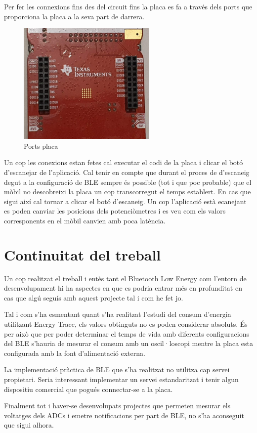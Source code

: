 Per fer les connexions fins des del circuit fins la placa es fa a través dels ports que proporciona la placa a la seva part de darrera.

\begin{figure}[!h]
	\begin{center}
		\includegraphics[angle=90, width=0.6\textwidth]{./images/connexions_placa.jpg}
		\caption{Ports placa}
	\end{center}
\end{figure}

Un cop les conexions estan fetes cal executar el codi de la placa i clicar el botó d'escanejar de l'aplicació.
Cal tenir en compte que durant el proces de d'escaneig degut a la configuració de BLE sempre és possible (tot i que poc probable) que el mòbil no descobreixi la placa un cop transcorregut el temps establert.
En cas que sigui així cal tornar a clicar el botó d'escaneig.
Un cop l'aplicació està ecanejant es poden canviar les posicions dels potenciòmetres i es veu com els valors corresponents en el mòbil canvien amb poca latència.

\section{Continuitat del treball}
Un cop realitzat el treball i entès tant el Bluetooth Low Energy com l'entorn de desenvolupament hi ha aspectes en que es podria entrar més en profunditat en cas que algú seguís amb aquest projecte tal i com he fet jo.

Tal i com s'ha esmentant quant s'ha realitzat l'estudi del consum d'energia utilitzant Energy Trace, els valors obtinguts no es poden considerar absoluts.
És per això que per poder determinar el temps de vida amb diferents configuracions del BLE s'hauria de mesurar el consum amb un oscil·loscopi mentre la placa esta configurada amb la font d'alimentació externa.

La implementació pràctica de BLE que s'ha realitzat no utilitza cap servei propietari.
Seria interessant implementar un servei estandaritzat i tenir algun dispositiu comercial que pogués connectar-se a la placa.

Finalment tot i haver-se desenvolupats projectes que permeten mesurar els voltatges dels ADCs i emetre notificacions per part de BLE, no s'ha aconseguit que sigui alhora.

